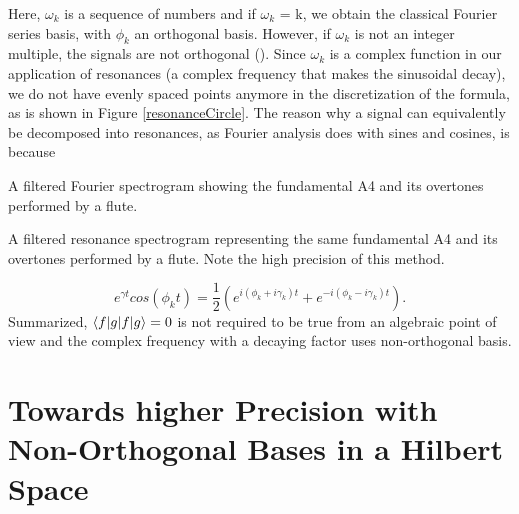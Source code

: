 Here, $\omega_k$ is a sequence of numbers and if  $\omega_k$ = k, we obtain the classical Fourier series basis, with $\phi_k$ an orthogonal basis. 
However, if $\omega_k$ is not an integer multiple, the signals are not orthogonal (\cite{romberg_ece_2016}). Since $\omega_k$ is a complex function in our application of resonances (a complex frequency that makes the sinusoidal decay), we do not have evenly spaced points anymore in the discretization of the formula, as is shown in Figure \ref{resonanceCircle}.
The reason why a signal can equivalently be decomposed into resonances, as Fourier analysis does with sines and cosines, is because
\begin{marginfigure}
\centering
\vspace*{-7cm}

\label{topview_stft} 
\end{marginfigure}
\begin{marginfigure}
\vspace*{-1.6cm}
\centering

\caption{A filtered Fourier spectrogram showing the fundamental A4 and its overtones performed by a flute.} 
\label{fourierSpectrogram} 
\end{marginfigure}
\begin{marginfigure}
\centering
\vspace*{1.2cm}

\label{topview_fpt} 
\end{marginfigure}
\begin{marginfigure}
\centering

\caption{A filtered resonance spectrogram representing the same fundamental A4 and its overtones performed by a flute. Note the high precision of this method.}
\label{resonanceSpectrogram} 
\end{marginfigure}
\begin{equation}
    e^{\gamma t} cos(\phi_k t) = \frac{1}{2}( e^{i (\phi_k + i \gamma_k) t} +  e^{-i (\phi_k - i \gamma_k) t}).
\end{equation}
Summarized, $\braket{f|g} = 0$ is not required to be true from an algebraic point of view and the complex frequency with a decaying factor uses non-orthogonal basis.




\section{Towards higher Precision with Non-Orthogonal Bases in a Hilbert Space}
\label{sec:nonorthogonalBases}

